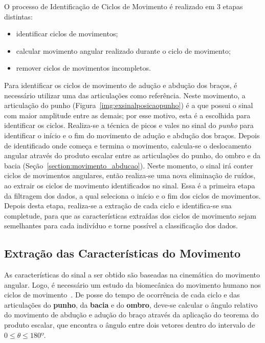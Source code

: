 O processo de Identificação de Ciclos de Movimento é realizado em 3 etapas distintas:
\begin{itemize}
	\item identificar ciclos de movimentos;
	\item calcular movimento angular realizado durante o ciclo de movimento;
	\item remover ciclos de movimentos incompletos.
\end{itemize}

Para identificar os ciclos de movimento de adução e abdução dos braços, é necessário utilizar uma das articulações como referência. Neste movimento, a articulação do punho (Figura~\ref{img:exsinalposicaopunho}) é a que possui o sinal com maior amplitude entre as demais; por esse motivo, esta é a escolhida para identificar os ciclos. Realiza-se a técnica de picos e vales no sinal do \textit{punho} para identificar o início e o fim do movimento de adução e abdução dos braços. Depois de identificado onde começa e termina o movimento, calcula-se o deslocamento angular através do produto escalar entre as articulações do punho, do ombro e da bacia (Seção~\ref{section:movimento_abducao}). Neste momento, o sinal irá conter ciclos de movimentos angulares, então realiza-se uma nova eliminação de ruídos, ao extrair os ciclos de movimento identificados no sinal. Essa é a primeira etapa da filtragem dos dados, a qual seleciona o início e o fim dos ciclos de movimentos. Depois desta etapa, realiza-se a extração de cada ciclo e identifica-se sua completude, para que as características extraídas dos ciclos de movimento sejam semelhantes para cada indivíduo e torne possível a classificação dos dados.




\subsection{Extração das Características do Movimento} \label{sec:extracao_caracteristcas}
As características do sinal a ser obtido são baseadas na cinemática do movimento angular. Logo, é necessário um estudo da biomecânica do movimento humano nos ciclos de movimento~\cite{hamill1999bases}. De posse do tempo de ocorrência de cada ciclo e das articulações do \textbf{punho}, da \textbf{bacia} e do \textbf{ombro}, deve-se calcular o ângulo relativo do movimento de abdução e adução do braço através da aplicação do teorema do produto escalar, que encontra o ângulo entre dois vetores dentro do intervalo de $0 \leq \theta \leq 180º$.

